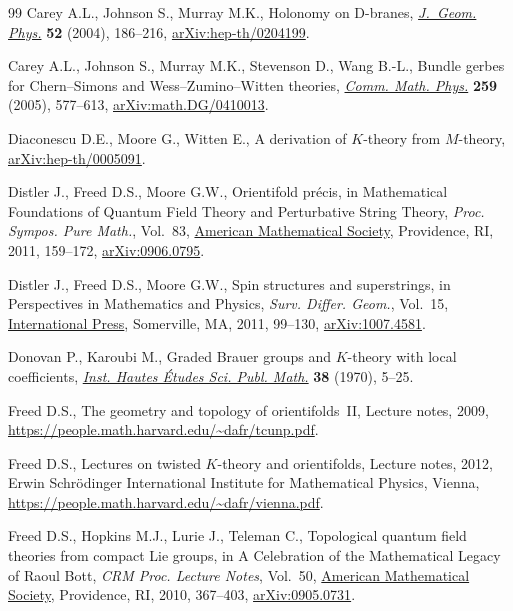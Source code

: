 \documentclass[pdftex]{sigma}
\numberwithin{equation}{section}
\begin{document}
\begin{thebibliography}{99}
Carey A.L., Johnson S., Murray M.K., Holonomy on {D}-branes,
 \href{https://doi.org/10.1016/j.geomphys.2004.02.008}{\textit{J.~Geom.
 Phys.}} \textbf{52} (2004), 186--216,
 \href{http://arxiv.org/abs/hep-th/0204199}{arXiv:hep-th/0204199}.

Carey A.L., Johnson S., Murray M.K., Stevenson D., Wang B.-L., Bundle gerbes for
 {C}hern--{S}imons and {W}ess--{Z}umino--{W}itten theories,
 \href{https://doi.org/10.1007/s00220-005-1376-8}{\textit{Comm. Math. Phys.}}
 \textbf{259} (2005), 577--613,
 \href{http://arxiv.org/abs/math.DG/0410013}{arXiv:math.DG/0410013}.

Diaconescu D.E., Moore G., Witten E., A derivation of {$K$}-theory from
 {$M$}-theory,
 \href{http://arxiv.org/abs/hep-th/0005091}{arXiv:hep-th/0005091}.

Distler J., Freed D.S., Moore G.W., Orientifold pr\'ecis, in Mathematical
 {F}oundations of {Q}uantum {F}ield {T}heory and {P}erturbative {S}tring
 {T}heory, \textit{Proc. Sympos. Pure Math.}, Vol.~83,
 \href{https://doi.org/10.1090/pspum/083/2742428}{American Mathematical
 Society}, Providence, RI, 2011, 159--172,
 \href{http://arxiv.org/abs/0906.0795}{arXiv:0906.0795}.

Distler J., Freed D.S., Moore G.W., Spin structures and superstrings, in
 {P}erspectives in {M}athematics and {P}hysics, \textit{Surv. Differ. Geom.},
 Vol.~15, \href{https://doi.org/10.4310/SDG.2010.v15.n1.a4}{International
 Press}, Somerville, MA, 2011, 99--130,
 \href{http://arxiv.org/abs/1007.4581}{arXiv:1007.4581}.

Donovan P., Karoubi M., Graded {B}rauer groups and {$K$}-theory with local
 coefficients, \href{https://doi.org/10.1007/BF02684650}{\textit{Inst. Hautes
 \'{E}tudes Sci. Publ. Math.}} \textbf{38} (1970), 5--25.

Freed D.S., The geometry and topology of orientifolds~{II}, {L}ecture notes,
 2009, \url{https://people.math.harvard.edu/~dafr/tcunp.pdf}.

Freed D.S., Lectures on twisted {$K$}-theory and orientifolds, {L}ecture notes,
 2012, Erwin Schr\"{o}dinger International Institute for Mathematical Physics,
 Vienna, \url{https://people.math.harvard.edu/~dafr/vienna.pdf}.

Freed D.S., Hopkins M.J., Lurie J., Teleman C., Topological quantum field
 theories from compact {L}ie groups, in A {C}elebration of the {M}athematical
 {L}egacy of {R}aoul {B}ott, \textit{CRM Proc. Lecture Notes}, Vol.~50,
 \href{https://doi.org/10.1090/crmp/050/26}{American Mathematical Society},
 Providence, RI, 2010, 367--403,
 \href{http://arxiv.org/abs/0905.0731}{arXiv:0905.0731}.


\end{thebibliography}
\end{document}
